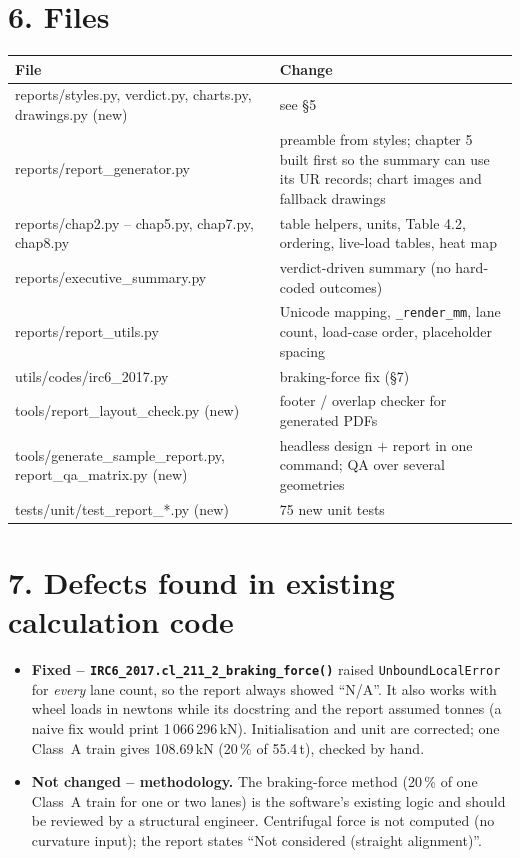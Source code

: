 \documentclass[11pt,a4paper]{article}
\begin{document}
\section*{6. Files}
\begin{tabularx}{\textwidth}{@{}>{\ttfamily}l Y@{}}
\toprule
\textrm{\textbf{File}} & \textbf{Change}\\
\midrule
reports/styles.py, verdict.py, charts.py, drawings.py \textrm{(new)} & see \S5\\
reports/report\_generator.py & preamble from styles; chapter 5 built first so the summary can use its UR records; chart images and fallback drawings\\
reports/chap2.py -- chap5.py, chap7.py, chap8.py & table helpers, units, Table 4.2, ordering, live-load tables, heat map\\
reports/executive\_summary.py & verdict-driven summary (no hard-coded outcomes)\\
reports/report\_utils.py & Unicode mapping, \verb|_render_mm|, lane count, load-case order, placeholder spacing\\
utils/codes/irc6\_2017.py & braking-force fix (\S7)\\
tools/report\_layout\_check.py \textrm{(new)} & footer / overlap checker for generated PDFs\\
tools/generate\_sample\_report.py, report\_qa\_matrix.py \textrm{(new)} & headless design + report in one command; QA over several geometries\\
tests/unit/test\_report\_*.py \textrm{(new)} & 75 new unit tests\\
\bottomrule
\end{tabularx}

\section*{7. Defects found in existing calculation code}
\begin{itemize}
\item \textbf{Fixed -- \texttt{IRC6\_2017.cl\_211\_2\_braking\_force()}} raised \texttt{UnboundLocalError} for
\emph{every} lane count, so the report always showed ``N/A''. It also works with wheel loads in newtons while
its docstring and the report assumed tonnes (a naive fix would print 1\,066\,296\,kN). Initialisation and unit
are corrected; one Class~A train gives 108.69\,kN (20\,\% of 55.4\,t), checked by hand.
\item \textbf{Not changed -- methodology.} The braking-force method (20\,\% of one Class~A train for one or two
lanes) is the software's existing logic and should be reviewed by a structural engineer. Centrifugal force is
not computed (no curvature input); the report states ``Not considered (straight alignment)''.
\end{itemize}
\end{document}
